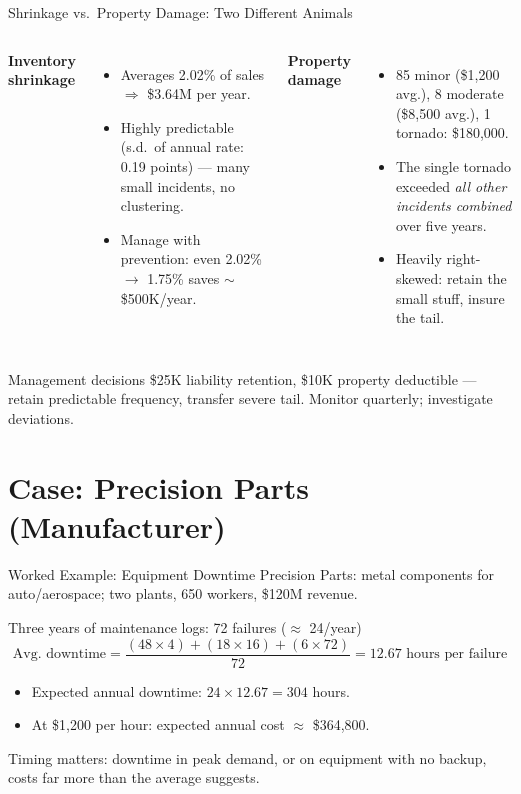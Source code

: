 \documentclass[11pt, aspectratio=169]{beamer}
\begin{document}
\begin{frame}{Shrinkage vs.\ Property Damage: Two Different Animals}
\begin{columns}[T]
\textbf{Inventory shrinkage}
\begin{itemize}
  \item Averages 2.02\% of sales $\Rightarrow$ \$3.64M per year.
  \item Highly predictable (s.d.\ of annual rate: 0.19 points) --- many small incidents, no clustering.
  \item Manage with prevention: even 2.02\% $\to$ 1.75\% saves $\sim$\$500K/year.
\end{itemize}
\textbf{Property damage}
\begin{itemize}
  \item 85 minor (\$1{,}200 avg.), 8 moderate (\$8{,}500 avg.), 1 tornado: \$180{,}000.
  \item The single tornado exceeded \emph{all other incidents combined} over five years.
  \item Heavily right-skewed: retain the small stuff, insure the tail.
\end{itemize}
\end{columns}
\medskip
\begin{block}{Management decisions}
\$25K liability retention, \$10K property deductible --- retain predictable frequency, transfer severe tail. Monitor quarterly; investigate deviations.
\end{block}
\end{frame}

\section{Case: Precision Parts (Manufacturer)}

\begin{frame}{Worked Example: Equipment Downtime}
Precision Parts: metal components for auto/aerospace; two plants, 650 workers, \$120M revenue.
\begin{exampleblock}{Three years of maintenance logs: 72 failures ($\approx$ 24/year)}
\[
\text{Avg.\ downtime} = \frac{(48 \times 4) + (18 \times 16) + (6 \times 72)}{72} = 12.67 \text{ hours per failure}
\]
\begin{itemize}
  \item Expected annual downtime: $24 \times 12.67 = 304$ hours.
  \item At \$1{,}200 per hour: expected annual cost $\approx$ \alert{\$364{,}800}.
\end{itemize}
\end{exampleblock}
Timing matters: downtime in peak demand, or on equipment with no backup, costs far more than the average suggests.
\end{frame}
\end{document}
